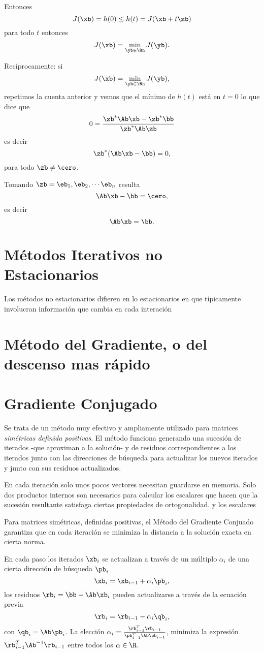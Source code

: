 Entonces
$$
J(\xb)=h(0)\le h(t)=J(\xb+t\zb)
$$
para todo $t$ entonces
$$
J(\xb)=\min_{\yb\in\Rn}J(\yb).
$$

Recíprocamente: si
$$
J(\xb)=\min_{\yb\in\Rn}J(\yb),
$$
repetimos la cuenta anterior y vemos que el mínimo de $h(t)$ está en $t=0$ lo que dice que
$$0=\frac{\zb^*\Ab\xb-\zb^*\bb}{\zb^*\Ab\zb}
$$
es decir
$$
\zb^*(\Ab\xb-\bb)=0,
$$
para todo $\zb\neq \cero$.


Tomando $\zb=\eb_1,\eb_2,\cdots \eb_n$ resulta
$$
\Ab\xb-\bb=\cero,
$$
es decir
$$
\Ab\xb=\bb.
 $$


\section{M\'etodos Iterativos no Estacionarios}
Los métodos no estacionarios difieren en lo estacionarios en que típicamente involucran información que cambia en cada interación
\section{Método del Gradiente, o del descenso mas rápido}

\section{Gradiente Conjugado}
Se trata de un método muy efectivo y ampliamente utilizado para matrices \emph{simétricas definida positivas}. El método funciona generando una sucesión de iterados -que aproximan a la solución- y de residuos correspondientes a los iterados junto con las direcciones de búsqueda para actualizar los nuevos iterados y junto con sus residuos actualizados.

En cada iteración solo unos pocos vectores necesitan guardarse en memoria. Solo dos productos internos son necesarios para calcular los escalares que hacen que la sucesión resultante satisfaga ciertas propiedades de ortogonalidad. y los escalares

\tcc
Para matrices simétricas, definidas positivas, el Método del Gradiente Conjuado garantiza que en cada iteración se minimiza la distancia a la solución exacta en cierta norma.
\etcc

En cada paso los iterados $\xb_i$ se actualizan a través de un múltiplo $\alpha_i$ de una cierta dirección de  búsqueda $\pb_i$
$$
\xb_i=\xb_{i-1}+\alpha_i\pb_i,
$$
los residuos $\rb_i=\bb-\Ab\xb_i$ pueden actualizarse a través de la ecuación previa
$$
\rb_i=\rb_{i-1}-\alpha_i\qb_i,
$$
con $\qb_i=\Ab\pb_i$.
La elección $\alpha_i=\frac{\rb_{i-1}^T\rb_{i-1}}{\pb_{i-1}^T\Ab\pb_{i-1}}$,
minimiza la expresión $\rb_{i-1}^T\Ab^{-1}\rb_{i-1}$ entre todos los
$\alpha\in \R$.

